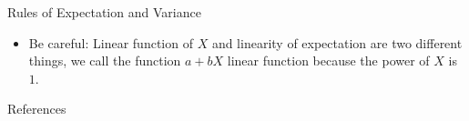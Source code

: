 \documentclass[8pt, usepdftitle=false]{beamer}
\begin{document}
\begin{frame}[allowframebreaks]{Rules of Expectation and Variance}
\begin{itemize}
\begin{varblock}{Rules of Expectation and Variance}

Let $X$ be a random variable, then

\begin{itemize}
\item 1. [LOTUS] We can calculate $\mathbb{E}(g(X))$ using 

\begin{align*}
\mathbb{E}(g(X)) &= \sum_{\text {all values } x} g(x) f(x) \quad \text{ [when $X$ is discrete]}\\
\mathbb{E}(g(X)) &=\int_{-\infty}^{\infty} g(x) f(x) d x \quad \text{ [when $X$ is continuous]} 
\end{align*}


\item 2. For a function $g(X) = a + b X$ (we call this a linear function of $X$), we have 

\begin{align*}
\mathbb{E}(a + bX) &= a + b \mathbb{E} (X) \\
\Var(a + bX) &=  b^2 \mathrm{Var} (X)
\end{align*}

\end{itemize}


\end{varblock}

\item {\color{red} Be careful:} Linear function of $X$ and linearity of expectation are two different things, we call the function $a + b X$ linear function because the power of $X$ is $1$. 

\end{itemize}
\end{frame}







\begin{frame}[allowframebreaks]{References}
\vspace*{.3cm} 

\scriptsize


  

\end{frame}
\end{document}
